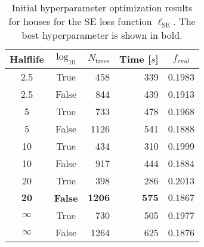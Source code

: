 \begin{table}[h!]
  \centerfloat
  \begin{tabular}{@{}ccrrc@{}}
    Halflife & $\log_{10}$ & $N_\mathrm{trees}$ & Time [$s$] & $f_\mathrm{eval}$ \\
    \midrule
    \num{2.5} & True & \num{458} & \num{339} & \num{0.1983} \\
    \num{2.5} & False & \num{844} & \num{439} & \num{0.1913} \\
    \num{5} & True & \num{733} & \num{478} & \num{0.1968} \\
    \num{5} & False & \num{1126} & \num{541} & \num{0.1888} \\
    \num{10} & True & \num{434} & \num{310} & \num{0.1999} \\
    \num{10} & False & \num{917} & \num{444} & \num{0.1884} \\
    \num{20} & True & \num{398} & \num{286} & \num{0.2013} \\
    $\mathbf{20}$ & \textbf{False} & $\mathbf{1206}$ & $\mathbf{575}$ & $\mathbf{0.1867}$ \\
    $\infty$ & True & \num{730} & \num{505} & \num{0.1977} \\
    $\infty$ & False & \num{1264} & \num{625} & \num{0.1876} \\
  \end{tabular}
  \caption[Initial Hyperparameter Optimization Results for Houses -- SE Loss Function]{\label{tab:h:HPO_initial_Rmse-villa-appendix}Initial hyperparameter optimization results for houses for the SE loss function $\ell_\mathrm{SE}$. The best hyperparameter is shown in bold.}
\end{table}



